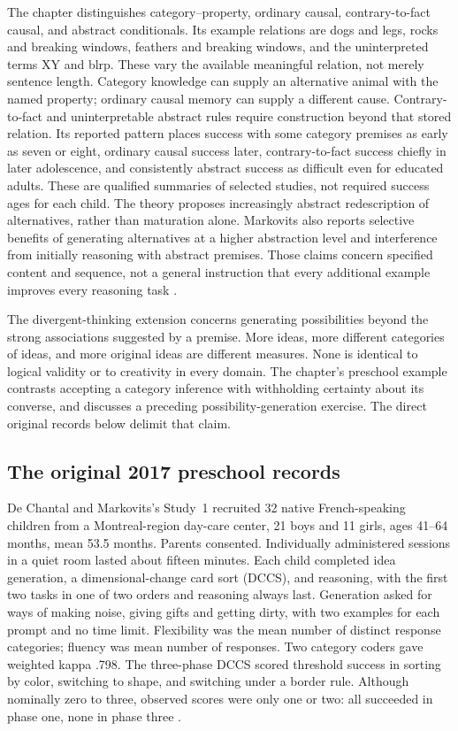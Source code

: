The chapter distinguishes category--property, ordinary causal,
contrary-to-fact causal, and abstract conditionals. Its example relations are
dogs and legs, rocks and breaking windows, feathers and breaking windows,
and the uninterpreted terms XY and blrp. These vary the available meaningful
relation, not merely sentence length. Category knowledge can
supply an alternative animal with the named property; ordinary causal memory
can supply a different cause. Contrary-to-fact and uninterpretable abstract
rules require construction beyond that stored relation. Its reported pattern
places success with some category premises as early as seven or eight,
ordinary causal success later, contrary-to-fact success chiefly in later
adolescence, and consistently abstract success as difficult even for educated
adults. These are qualified summaries of selected studies, not required
success ages for each child. The theory proposes increasingly abstract
redescription of alternatives, rather than maturation alone. Markovits also
reports selective benefits of generating alternatives at a higher abstraction
level and interference from initially reasoning with abstract premises.
Those claims concern specified content and sequence, not a general instruction
that every additional example improves every reasoning task
\cite[pp.~785--786]{Markovits2021DevelopmentRationality}.

The divergent-thinking extension concerns generating possibilities beyond the
strong associations suggested by a premise. More ideas, more different
categories of ideas, and more original ideas are different measures. None is
identical to logical validity or to creativity in every domain. The chapter's
preschool example contrasts accepting a category inference with withholding
certainty about its converse, and discusses a preceding possibility-generation
exercise. The direct original records below delimit that claim.

\subsection{The original 2017 preschool records}
\label{sec:p19-r151-2017-record}

De Chantal and Markovits's Study~1 recruited 32 native French-speaking
children from a Montreal-region day-care center, 21 boys and 11 girls,
ages 41--64 months, mean 53.5 months. Parents consented. Individually
administered sessions in a quiet room lasted about fifteen minutes. Each child
completed idea generation, a dimensional-change card sort (DCCS), and reasoning,
with the first two tasks in one of two orders and reasoning always last.
Generation asked for ways of making noise, giving gifts and getting dirty,
with two examples for each prompt and no time limit. Flexibility was the mean
number of distinct response categories; fluency was mean number of responses.
Two category coders gave weighted kappa .798. The three-phase DCCS scored
threshold success in sorting by color, switching to shape, and switching under
a border rule. Although nominally zero to three, observed scores were only
one or two: all succeeded in phase one, none in phase three
\cite[pp.~210--214]{DeChantalMarkovits2017Alternatives}.

